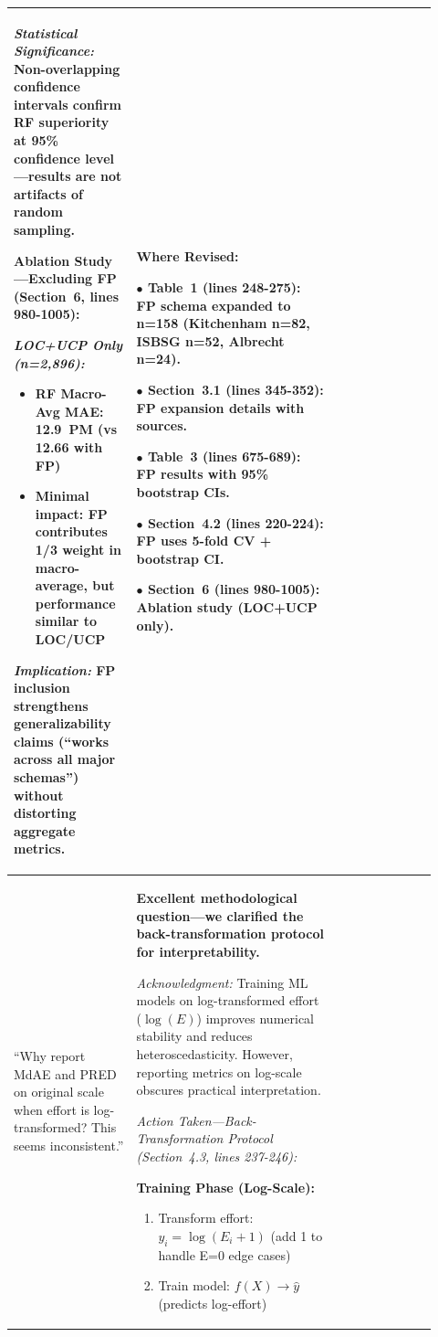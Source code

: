 \documentclass[11pt,a4paper]{article}
\begin{document}
\begin{longtable}{>{\raggedright\arraybackslash}p{0.26\linewidth}|>{\raggedright\arraybackslash}p{0.44\linewidth}|>{\raggedright\arraybackslash}p{0.22\linewidth}}
\textit{Statistical Significance:} Non-overlapping confidence intervals confirm RF superiority at 95\% confidence level---results are not artifacts of random sampling.

\textbf{Ablation Study---Excluding FP (Section~6, lines 980-1005):}

\textit{LOC+UCP Only (n=2,896):}
\begin{itemize}
    \item RF Macro-Avg MAE: 12.9~PM (vs 12.66 with FP)
    \item Minimal impact: FP contributes 1/3 weight in macro-average, but performance similar to LOC/UCP
\end{itemize}

\textit{Implication:} FP inclusion strengthens generalizability claims (``works across all major schemas'') without distorting aggregate metrics. &

\textbf{Where Revised:}

$\bullet$ \textbf{Table~1} (lines 248-275): FP schema expanded to n=158 (Kitchenham n=82, ISBSG n=52, Albrecht n=24).

$\bullet$ \textbf{Section~3.1} (lines 345-352): FP expansion details with sources.

$\bullet$ \textbf{Table~3} (lines 675-689): FP results with 95\% bootstrap CIs.

$\bullet$ \textbf{Section~4.2} (lines 220-224): FP uses 5-fold CV + bootstrap CI.

$\bullet$ \textbf{Section~6} (lines 980-1005): Ablation study (LOC+UCP only). \\

\midrule

``Why report MdAE and PRED on original scale when effort is log-transformed? This seems inconsistent.'' &

\textbf{Excellent methodological question---we clarified the back-transformation protocol for interpretability.}

\textit{Acknowledgment:} Training ML models on log-transformed effort ($\log(E)$) improves numerical stability and reduces heteroscedasticity. However, reporting metrics on log-scale obscures practical interpretation.

\textit{Action Taken---Back-Transformation Protocol (Section~4.3, lines 237-246):}

\textbf{Training Phase (Log-Scale):}

\begin{enumerate}
    \item Transform effort: $y_i = \log(E_i + 1)$ (add 1 to handle E=0 edge cases)
    \item Train model: $f(X) \rightarrow \hat{y}$ (predicts log-effort)
\end{enumerate}


\end{longtable}
\end{document}

